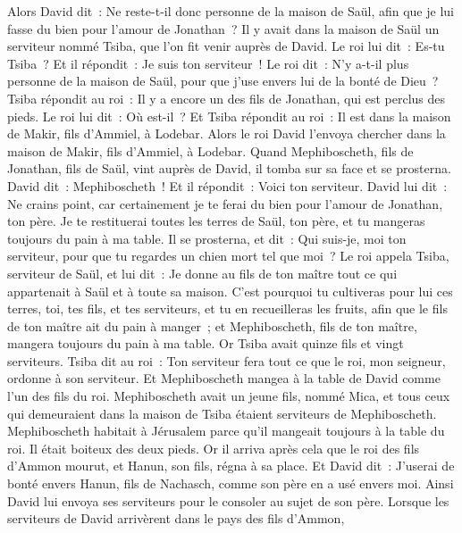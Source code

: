 \begin{multicols}{2}
\VerseOne{}Alors David dit~: Ne reste-t-il donc personne de la maison de Saül, afin que je lui fasse du bien pour l'amour de Jonathan~?
Il y avait dans la maison de Saül un serviteur nommé Tsiba, que l'on fit venir auprès de David. Le roi lui dit~: Es-tu Tsiba~? Et il répondit~: Je suis ton serviteur~!
Le roi dit~: N'y a-t-il plus personne de la maison de Saül, pour que j'use envers lui de la bonté de Dieu~? Tsiba répondit au roi~: Il y a encore un des fils de Jonathan, qui est perclus des pieds.
Le roi lui dit~: Où est-il~? Et Tsiba répondit au roi~: Il est dans la maison de Makir, fils d'Ammiel, à Lodebar.
Alors le roi David l'envoya chercher dans la maison de Makir, fils d'Ammiel, à Lodebar.
Quand Mephiboscheth, fils de Jonathan, fils de Saül, vint auprès de David, il tomba sur sa face et se prosterna. David dit~: Mephiboscheth~! Et il répondit~: Voici ton serviteur.
David lui dit~: Ne crains point, car certainement je te ferai du bien pour l'amour de Jonathan, ton père. Je te restituerai toutes les terres de Saül, ton père, et tu mangeras toujours du pain à ma table.
Il se prosterna, et dit~: Qui suis-je, moi ton serviteur, pour que tu regardes un chien mort tel que moi~?
Le roi appela Tsiba, serviteur de Saül, et lui dit~: Je donne au fils de ton maître tout ce qui appartenait à Saül et à toute sa maison.
C'est pourquoi tu cultiveras pour lui ces terres, toi, tes fils, et tes serviteurs, et tu en recueilleras les fruits, afin que le fils de ton maître ait du pain à manger~; et Mephiboscheth, fils de ton maître, mangera toujours du pain à ma table. Or Tsiba avait quinze fils et vingt serviteurs.
Tsiba dit au roi~: Ton serviteur fera tout ce que le roi, mon seigneur, ordonne à son serviteur. Et Mephiboscheth mangea à la table de David comme l'un des fils du roi.
Mephiboscheth avait un jeune fils, nommé Mica, et tous ceux qui demeuraient dans la maison de Tsiba étaient serviteurs de Mephiboscheth.
Mephiboscheth habitait à Jérusalem parce qu'il mangeait toujours à la table du roi. Il était boiteux des deux pieds.
\VerseOne{}Or il arriva après cela que le roi des fils d'Ammon mourut, et Hanun, son fils, régna à sa place.
Et David dit~: J'userai de bonté envers Hanun, fils de Nachasch, comme son père en a usé envers moi. Ainsi David lui envoya ses serviteurs pour le consoler au sujet de son père. Lorsque les serviteurs de David arrivèrent dans le pays des fils d'Ammon,

\end{multicols}

